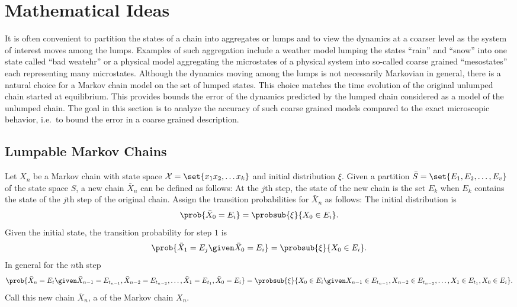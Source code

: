 \documentclass[12pt]{article}
\begin{document}
\hr

\section*{Mathematical Ideas}

It is often convenient to partition the states of a chain into
aggregates or lumps and to view the dynamics at a coarser level as the
system of interest moves among the lumps. Examples of such aggregation
include a weather model lumping the states ``rain'' and ``snow'' into
one state called ``bad weatehr'' or a physical model aggregating the
microstates of a physical system into so-called coarse grained
``mesostates'' each representing many microstates. Although the
dynamics moving among the lumps is not necessarily Markovian in
general, there is a natural choice for a Markov chain model on the set
of lumped states. This choice matches the time evolution of
the original unlumped chain started at equilibrium. 
This provides bounds the error of the dynamics predicted by the lumped chain
considered as a model of the unlumped chain. The goal in this section
is to analyze the accuracy of such coarse grained models compared
to the exact microscopic behavior, i.e.\ to bound the error in a coarse
grained description.

\subsection*{Lumpable Markov Chains}


\begin{definition}
  Let $X_n$ be a Markov chain with state space \( \mathcal{X} =
\set{x_1 x_2, \dots x_k} \) and initial distribution \( \xi \). Given a
partition \( \bar{S} = \set{E_1, E_2,  \dots, E_v} \) of the state space
  $S$, a new chain \( \bar{X}_n \) can be defined as
follows: At the $j$th step, the state of the new chain is the set
$E_k$ when $E_k$ contains the state of the $j$th step of the original
chain.  Assign the transition probabilities for $\bar{X}_n$ as follows:
The initial distribution is
\[
  \prob{\bar{X}_0 = E_i} = \probsub{\xi}{X_0 \in E_i}.
\]
Given the initial state, the transition probability for step $1$ is
\[
  \prob{\bar{X}_1 = E_j \given \bar{X}_0 = E_i} = \probsub{\xi}{X_0
  \in E_i }.
\]
In general for the $n$th step
\[
  \prob{\bar{X}_n = E_t \given \bar{X}_{n-1} = E_{t_{n-1}},
    \bar{X}_{n-2} = E_{t_{n-2}}, \dots,  \bar{X}_1 = E_{t_1},
    \bar{X}_0 = E_i} = \probsub{\xi}{X_0 \in E_i \given X_{n-1} \in E_{t_{n-1}},
    X_{n-2} \in E_{t_{n-2}}, \dots,  X_1 \in E_{t_1},
    X_0 \in E_i}.
\]
Call this new chain \( \bar{X}_n \), a  of the
Markov chain \( X_n \).
\end{definition}
\end{document}
